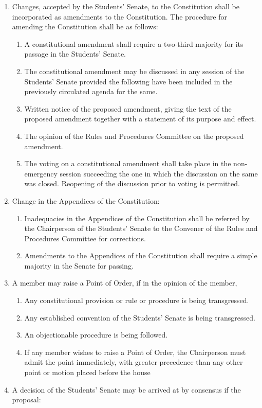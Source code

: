 \begin{enumerate}
\def\labelenumi{\arabic{enumi}.}
\item
  Changes, accepted by the Students' Senate, to the Constitution shall
  be incorporated as amendments to the Constitution. The procedure for
  amending the Constitution shall be as follows:

  \begin{enumerate}
  \def\labelenumii{\alph{enumii}.}
  \item
    A constitutional amendment shall require a two-third majority for
    its passage in the Students' Senate.
  \item
    The constitutional amendment may be discussed in any session of the
    Students' Senate provided the following have been included in the
    previously circulated agenda for the same.
  \item
    Written notice of the proposed amendment, giving the text of the
    proposed amendment together with a statement of its purpose and
    effect.
  \item
    The opinion of the Rules and Procedures Committee on the proposed
    amendment.
  \item
    The voting on a constitutional amendment shall take place in the
    non- emergency session succeeding the one in which the discussion on
    the same was closed. Reopening of the discussion prior to voting is
    permitted.
  \end{enumerate}
\item
  Change in the Appendices of the Constitution:

  \begin{enumerate}
  \def\labelenumii{\alph{enumii}.}
  \item
    Inadequacies in the Appendices of the Constitution shall be referred
    by the Chairperson of the Students' Senate to the Convener of the
    Rules and Procedures Committee for corrections.
  \item
    Amendments to the Appendices of the Constitution shall require a
    simple majority in the Senate for passing.
  \end{enumerate}
\item
  A member may raise a Point of Order, if in the opinion of the member,

  \begin{enumerate}
  \def\labelenumii{\alph{enumii}.}
  \item
    Any constitutional provision or rule or procedure is being
    transgressed.
  \item
    Any established convention of the Students' Senate is being
    transgressed.
  \item
    An objectionable procedure is being followed.
  \item
    If any member wishes to raise a Point of Order, the Chairperson must
    admit the point immediately, with greater precedence than any other
    point or motion placed before the house
  \end{enumerate}
\item
  A decision of the Students' Senate may be arrived at by consensus if
  the proposal:


\end{enumerate}
